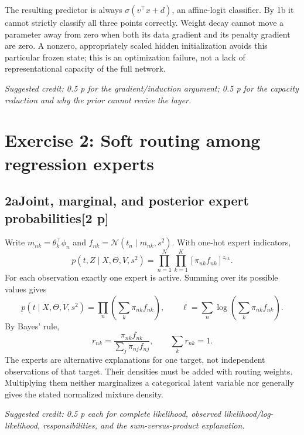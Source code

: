 \documentclass[11pt,a4paper]{article}
\newcommand{\solution}[3]{\Needspace{6\baselineskip}\subsection*{\color{examblue}#1\quad #2\hfill\normalsize[#3 p]}}
\newcommand{\selfcredit}[1]{\par\textit{Suggested credit: #1}\par}
\begin{document}
The resulting predictor is always $\sigma(v^\top x+d)$, an affine-logit
classifier. By 1b it cannot strictly classify all three points correctly.
Weight decay cannot move a parameter away from zero when both its data
gradient and its penalty gradient are zero. A nonzero, appropriately scaled
hidden initialization avoids this particular frozen state; this is an
optimization failure, not a lack of representational capacity of the full network.
\selfcredit{0.5 p for the gradient/induction argument; 0.5 p for the capacity reduction and why the prior cannot revive the layer.}

\newpage
\section*{Exercise 2: Soft routing among regression experts}
\solution{2a}{Joint, marginal, and posterior expert probabilities}{2}
Write $m_{nk}=\theta_k^\top\phi_n$ and
$f_{nk}=\mathcal N(t_n\mid m_{nk},s^2)$. With one-hot expert indicators,
\[
\boxed{p(t,Z\mid X,\Theta,V,s^2)=
\prod_{n=1}^N\prod_{k=1}^K[\pi_{nk}f_{nk}]^{z_{nk}}}.
\]
For each observation exactly one expert is active. Summing over its possible
values gives
\[
\boxed{p(t\mid X,\Theta,V,s^2)=\prod_n\left(\sum_k\pi_{nk}f_{nk}\right)},
\qquad
\boxed{\ell=\sum_n\log\left(\sum_k\pi_{nk}f_{nk}\right)}.
\]
By Bayes' rule,
\[
\boxed{r_{nk}=\frac{\pi_{nk}f_{nk}}{\sum_j\pi_{nj}f_{nj}}},\qquad
\sum_kr_{nk}=1.
\]
The experts are alternative explanations for one target, not independent
observations of that target. Their densities must be added with routing
weights. Multiplying them neither marginalizes a categorical latent variable
nor generally gives the stated normalized mixture density.
\selfcredit{0.5 p each for complete likelihood, observed likelihood/log-likelihood, responsibilities, and the sum-versus-product explanation.}
\end{document}
